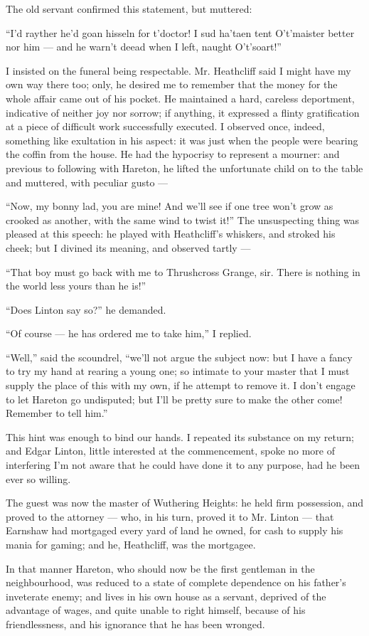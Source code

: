 \par The old servant confirmed this statement, but muttered:
\par “I'd rayther he'd goan hisseln for t'doctor! I sud ha'taen tent O't'maister better nor him — and he warn't deead when I left, naught O't'soart!”
\par I insisted on the funeral being respectable. Mr. Heathcliff said I might have my own way there too; only, he desired me to remember that the money for the whole affair came out of his pocket. He maintained a hard, careless deportment, indicative of neither joy nor sorrow; if anything, it expressed a flinty gratification at a piece of difficult work successfully executed. I observed once, indeed, something like exultation in his aspect: it was just when the people were bearing the coffin from the house. He had the hypocrisy to represent a mourner: and previous to following with Hareton, he lifted the unfortunate child on to the table and muttered, with peculiar gusto —
\par “Now, my bonny lad, you are mine! And we'll see if one tree won't grow as crooked as another, with the same wind to twist it!” The unsuspecting thing was pleased at this speech: he played with Heathcliff's whiskers, and stroked his cheek; but I divined its meaning, and observed tartly —
\par “That boy must go back with me to Thrushcross Grange, sir. There is nothing in the world less yours than he is!”
\par “Does Linton say so?” he demanded.
\par “Of course — he has ordered me to take him,” I replied.
\par “Well,” said the scoundrel, “we'll not argue the subject now: but I have a fancy to try my hand at rearing a young one; so intimate to your master that I must supply the place of this with my own, if he attempt to remove it. I don't engage to let Hareton go undisputed; but I'll be pretty sure to make the other come! Remember to tell him.”
\par This hint was enough to bind our hands. I repeated its substance on my return; and Edgar Linton, little interested at the commencement, spoke no more of interfering I'm not aware that he could have done it to any purpose, had he been ever so willing.
\par The guest was now the master of Wuthering Heights: he held firm possession, and proved to the attorney — who, in his turn, proved it to Mr. Linton — that Earnshaw had mortgaged every yard of land he owned, for cash to supply his mania for gaming; and he, Heathcliff, was the mortgagee.
\par In that manner Hareton, who should now be the first gentleman in the neighbourhood, was reduced to a state of complete dependence on his father's inveterate enemy; and lives in his own house as a servant, deprived of the advantage of wages, and quite unable to right himself, because of his friendlessness, and his ignorance that he has been wronged.











